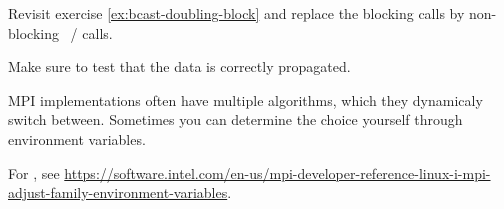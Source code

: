 \begin{exercise}
  \label{ex:bcast-doubling-nonblock}
  Revisit exercise \ref{ex:bcast-doubling-block} and replace the
  blocking calls by non-blocking ~/  calls.

  Make sure to test that the data is correctly propagated.
\end{exercise}

MPI implementations often have multiple algorithms, which they
dynamicaly switch between. Sometimes you can determine the choice yourself
through environment variables.

\begin{taccnote}
  For , see
  \url{https://software.intel.com/en-us/mpi-developer-reference-linux-i-mpi-adjust-family-environment-variables}.
\end{taccnote}
